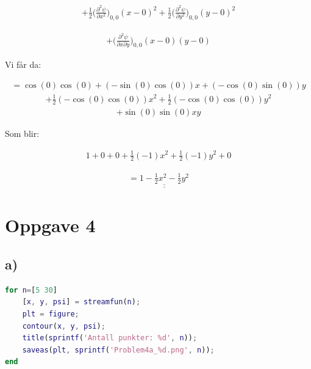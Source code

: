 \documentclass{article}
\newcommand{\answer}[1]{\underline{\underline{#1}}}
\begin{document}
\begin{flushle}
\begin{align*}
+ \frac{1}{2}\bigg( \frac{\partial^2 \psi}{\partial x^2} \bigg)_{0,0}(x - 0)^2 + \frac{1}{2}\bigg( \frac{\partial^2 \psi}{\partial y^2} \bigg)_{0,0}(y - 0)^2
\end{align*}

\begin{align*}
+ \bigg( \frac{\partial^2 \psi}{\partial x \partial y} \bigg)_{0,0}(x - 0)(y - 0)
\end{align*}

\begin{flushleft}
Vi får da:
\end{flushleft}

\begin{align*}
= \cos{(0)}\cos{(0)} + (-\sin{(0)}\cos{(0)})x + (-\cos{(0)}\sin{(0)})y
\end{align*}
\begin{align*}
+ \frac{1}{2}(-\cos{(0)}\cos{(0)})x^2 + \frac{1}{2}(-\cos{(0)}\cos{(0)})y^2
\end{align*}
\begin{align*}
+ \sin{(0)}\sin{(0)}xy
\end{align*}

\begin{flushleft}
Som blir:
\end{flushleft}

\begin{align*}
1 + 0 + 0 + \frac{1}{2}(-1)x^2 + \frac{1}{2}(-1)y^2 + 0
\end{align*}

\begin{align*}
= \answer{1 - \frac{1}{2}x^2 - \frac{1}{2}y^2}
\end{align*}

\newpage

\section*{Oppgave 4}

%
%

\subsection*{a)}


\begin{lstlisting}[language=Matlab]
for n=[5 30]
    [x, y, psi] = streamfun(n);
    plt = figure;
    contour(x, y, psi);
    title(sprintf('Antall punkter: %d', n));
    saveas(plt, sprintf('Problem4a_%d.png', n));
end
\end{lstlisting}


\end{flushle}
\end{document}
